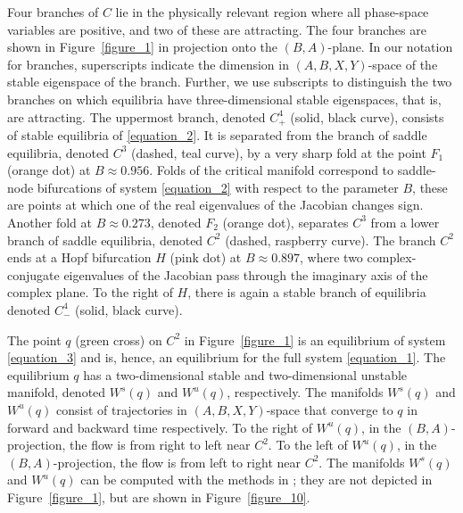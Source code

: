 \documentclass{ws-ijbc}
\begin{document}
Four branches of $C$ lie in the physically relevant region where all phase-space variables are positive, and two of these are attracting.  The four branches are shown in Figure~\ref{figure_1} in projection onto the $(B,A)$-plane.  In our notation for branches, superscripts indicate the dimension in $(A,B,X,Y)$-space of the stable eigenspace of the branch.  Further, we use subscripts to distinguish the two branches on which equilibria have three-dimensional stable eigenspaces, that is, are attracting.   The uppermost branch, denoted $C^4_+$ (solid, black curve), consists of stable equilibria of \eqref{equation_2}.  It is separated from the branch of saddle equilibria, denoted $C^3$ (dashed, teal curve), by a very sharp fold at the point $F_1$ (orange dot) at $B \approx 0.956$.  Folds of the critical manifold correspond to saddle-node bifurcations of system \eqref{equation_2} with respect to the parameter $B$, these are points at which one of the real eigenvalues of the Jacobian changes sign.  Another fold at $B \approx 0.273$, denoted $F_2$ (orange dot), separates $C^3$ from a lower branch of saddle equilibria, denoted $C^2$ (dashed, raspberry curve).   The branch $C^2$ ends at a Hopf bifurcation $H$ (pink dot) at $B \approx 0.897$, where two complex-conjugate eigenvalues of the Jacobian pass through the imaginary axis of the complex plane.  To the right of $H$, there is again a stable branch of equilibria denoted $C^4_-$ (solid, black curve).

The point $q$ (green cross) on $C^2$ in Figure~\ref{figure_1} is an equilibrium of system \eqref{equation_3} and is, hence, an equilibrium for the full system \eqref{equation_1}.  The equilibrium $q$ has a two-dimensional stable and two-dimensional unstable manifold, denoted $W^s(q)$ and $W^u(q)$, respectively.  The manifolds $W^{s}(q)$ and $W^{u}(q)$ consist of trajectories in $(A,B,X,Y)$-space that converge to $q$ in forward and backward time respectively.  To the right of $W^u(q)$, in the $(B,A)$-projection, the flow is from right to left near $C^2$.  To the left of $W^u(q)$, in the $(B,A)$-projection, the flow is from left to right near $C^2$.  The manifolds $W^{s}(q)$ and $W^{u}(q)$ can be computed with the methods in \cite{Red_book}; they are not depicted in Figure~\ref{figure_1}, but are shown in Figure~\ref{figure_10}.
\end{document}
